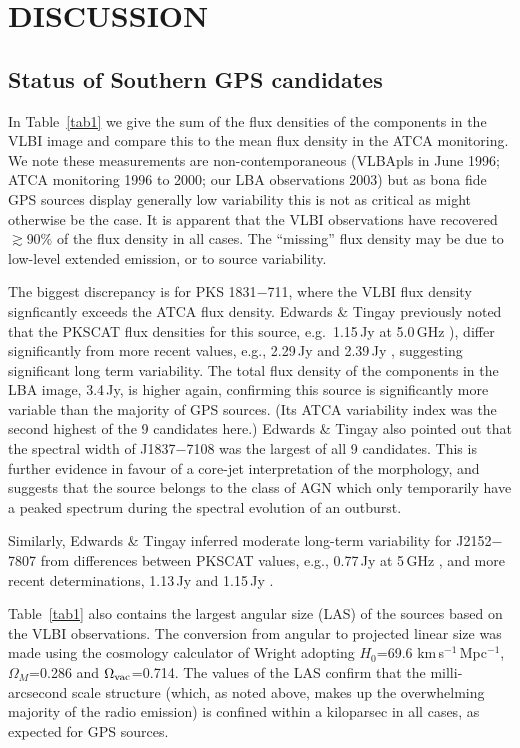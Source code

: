 \documentclass{pasa}%
\begin{document}
\section{DISCUSSION}

\subsection{\bf Status of Southern GPS candidates}

In Table~\ref{tab1} we give the sum of the flux densities of the
components in the VLBI image and compare this to the mean flux density
in the ATCA monitoring.  We note these measurements are
non-contemporaneous (VLBApls in June 1996; ATCA monitoring 1996 to
2000; our LBA observations 2003) but as bona fide GPS sources display generally
low variability this is not as critical as might otherwise be the
case. It is apparent that the VLBI observations have recovered
$\gtrsim$90\% of the flux density in all cases. The ``missing'' flux
density may be due to low-level extended emission, or to source
variability.

The biggest discrepancy is for PKS 1831$-$711, where the VLBI flux
density signficantly exceeds the ATCA flux density.  Edwards \& Tingay
 previously noted that the PKSCAT flux densities for
this source, e.g.\ 1.15\,Jy at 5.0\,GHz \cite{pkscat}), differ
significantly from more recent values, e.g., 2.29\,Jy \cite{wri94} and
2.39\,Jy \cite{tin03a}, suggesting significant long term variability.
The total flux density of the components in the LBA image, 3.4\,Jy, is
higher again, confirming this source is significantly more variable
than the majority of GPS sources. (Its ATCA variability index was the
second highest of the 9 candidates here.)  Edwards \& Tingay
 also pointed out that the spectral width of
J1837$-$7108 was the largest of all 9 candidates.  This is further
evidence in favour of a core-jet interpretation of the morphology, and
suggests that the source belongs to the class of AGN which only
temporarily have a peaked spectrum during the spectral evolution of an
outburst.

Similarly, Edwards \& Tingay  inferred moderate
long-term variability for J2152$-$7807 from differences between PKSCAT
values, e.g., 0.77\,Jy at 5\,GHz \cite{pkscat}, and more recent
determinations, 1.13\,Jy \cite{wri94} and 1.15\,Jy \cite{tin03a}.

Table~\ref{tab1} also contains the largest angular size (LAS) of the
sources based on the VLBI observations.  The conversion from angular
to projected linear size was made using the cosmology calculator of
Wright  adopting $H_0$=69.6 km\,s$^{-1}$\,Mpc$^{-1}$,
$\Omega_M$=0.286 and $\Omega_{\rm vac}$=0.714.  The values of the LAS
confirm that the milli-arcsecond scale structure (which, as noted
above, makes up the overwhelming majority of the radio emission) is
confined within a kiloparsec in all cases, as expected for GPS
sources.
\end{document}
